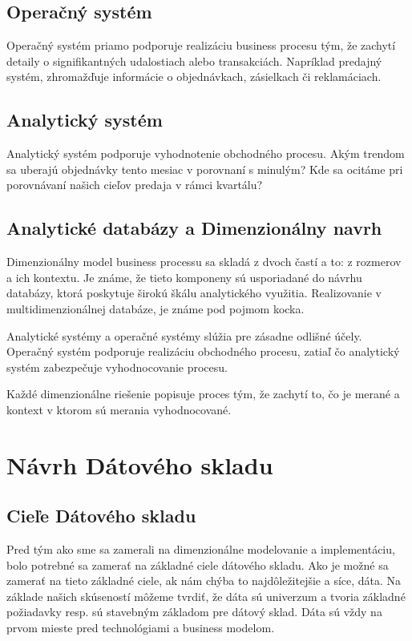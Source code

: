 \documentclass[letterpaper,12pt,oneside]{sphinxmanual}
\begin{document}
\subsection{Operačný systém}
\label{resume:operacny-system}
Operačný systém priamo podporuje realizáciu business procesu tým, že zachytí detaily o signifikantných udalostiach
alebo transakciách. Napríklad predajný systém,  zhromažďuje informácie o objednávkach, zásielkach či reklamáciach.


\subsection{Analytický systém}
\label{resume:analyticky-system}
Analytický systém podporuje vyhodnotenie obchodného procesu. Akým trendom sa uberajú objednávky tento mesiac v porovnaní s minulým?
Kde sa ocitáme pri porovnávaní našich cieľov predaja v rámci kvartálu?


\subsection{Analytické databázy a Dimenzionálny navrh}
\label{resume:analyticke-databazy-a-dimenzionalny-navrh}
Dimenzionálny model business processu sa skladá z dvoch častí a to:  z rozmerov a ich kontextu.
Je známe, že tieto komponeny sú usporiadané do návrhu databázy, ktorá poskytuje širokú škálu analytického využitia. Realizovanie v multidimenzionálnej databáze, je známe pod pojmom kocka.

Analytické systémy a operačné systémy slúžia pre zásadne odlišné účely. Operačný systém podporuje realizáciu obchodného procesu, zatiaľ čo analytický systém zabezpečuje vyhodnocovanie procesu.

Každé dimenzionálne riešenie popisuje proces tým, že zachytí to, čo je merané a kontext v ktorom sú merania vyhodnocované.


\section{Návrh Dátového skladu}
\label{resume:navrh-datoveho-skladu}

\subsection{Cieľe Dátového skladu}
\label{resume:ciele-datoveho-skladu}
Pred tým ako sme sa zamerali na dimenzionálne modelovanie a implementáciu, bolo potrebné sa zamerať na základné
ciele dátového skladu. Ako je možné sa zamerať na tieto základné ciele, ak nám chýba to najdôležitejšie a síce, dáta.
Na základe našich skúseností môžeme tvrdiť, že dáta sú univerzum a tvoria základné požiadavky resp. sú stavebným základom
pre dátový sklad. Dáta sú vždy na prvom mieste pred technológiami a business modelom.
\end{document}
